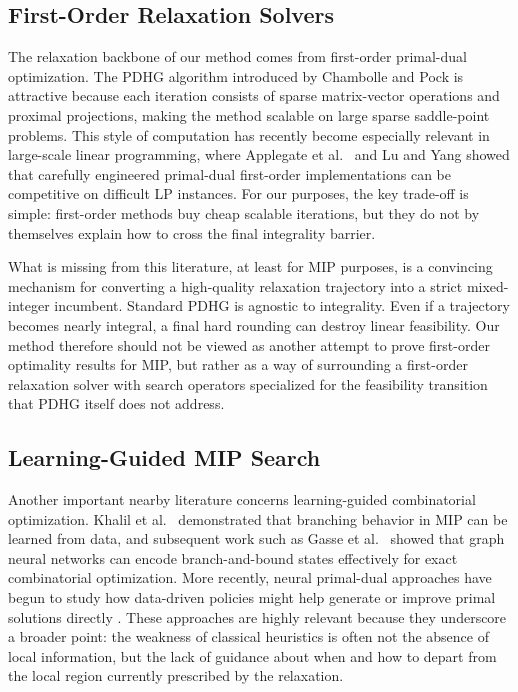 \subsection{First-Order Relaxation Solvers}

The relaxation backbone of our method comes from first-order primal-dual optimization. The PDHG algorithm introduced by Chambolle and Pock \cite{chambolle2011first} is attractive because each iteration consists of sparse matrix-vector operations and proximal projections, making the method scalable on large sparse saddle-point problems. This style of computation has recently become especially relevant in large-scale linear programming, where Applegate et al.~\cite{applegate2021practical} and Lu and Yang \cite{lu2023cupdlp} showed that carefully engineered primal-dual first-order implementations can be competitive on difficult LP instances. For our purposes, the key trade-off is simple: first-order methods buy cheap scalable iterations, but they do not by themselves explain how to cross the final integrality barrier.

What is missing from this literature, at least for MIP purposes, is a convincing mechanism for converting a high-quality relaxation trajectory into a strict mixed-integer incumbent. Standard PDHG is agnostic to integrality. Even if a trajectory becomes nearly integral, a final hard rounding can destroy linear feasibility. Our method therefore should not be viewed as another attempt to prove first-order optimality results for MIP, but rather as a way of surrounding a first-order relaxation solver with search operators specialized for the feasibility transition that PDHG itself does not address.

\subsection{Learning-Guided MIP Search}

Another important nearby literature concerns learning-guided combinatorial optimization. Khalil et al.~\cite{khalil2016learning} demonstrated that branching behavior in MIP can be learned from data, and subsequent work such as Gasse et al.~\cite{gasse2019exact} showed that graph neural networks can encode branch-and-bound states effectively for exact combinatorial optimization. More recently, neural primal-dual approaches have begun to study how data-driven policies might help generate or improve primal solutions directly \cite{niazadeh2022practical}. These approaches are highly relevant because they underscore a broader point: the weakness of classical heuristics is often not the absence of local information, but the lack of guidance about when and how to depart from the local region currently prescribed by the relaxation.

